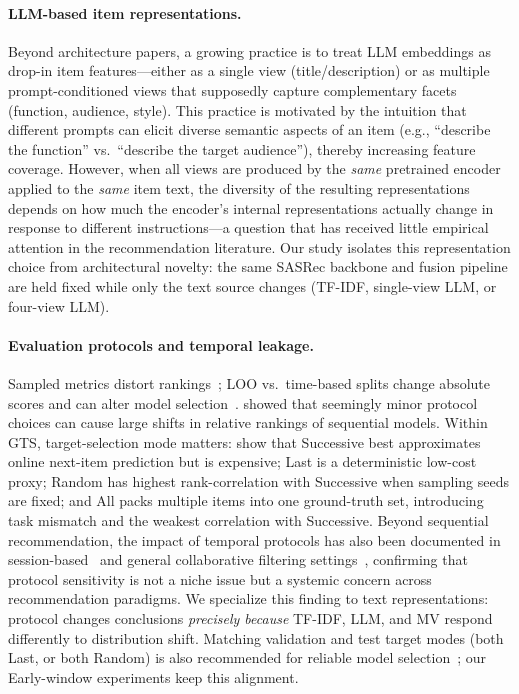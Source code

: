 \documentclass[sigconf,natbib=true,anonymous]{acmart}
\newcommand{\tfidf}{\textsc{TF-IDF}\xspace}
\newcommand{\llm}{\textsc{LLM}\xspace}
\newcommand{\mv}{\textsc{MV}\xspace}
\begin{document}
\paragraph{LLM-based item representations.}
Beyond architecture papers, a growing practice is to treat LLM embeddings as drop-in item features---either as a single view (title/description) or as multiple prompt-conditioned views that supposedly capture complementary facets (function, audience, style).
This practice is motivated by the intuition that different prompts can elicit diverse semantic aspects of an item (e.g., ``describe the function'' vs.\ ``describe the target audience''), thereby increasing feature coverage.
However, when all views are produced by the \emph{same} pretrained encoder applied to the \emph{same} item text, the diversity of the resulting representations depends on how much the encoder's internal representations actually change in response to different instructions---a question that has received little empirical attention in the recommendation literature.
Our study isolates this representation choice from architectural novelty: the same SASRec backbone and fusion pipeline are held fixed while only the text source changes (\tfidf, single-view \llm, or four-view \llm).

\paragraph{Evaluation protocols and temporal leakage.}
Sampled metrics distort rankings~\cite{krichene2020sampledmetrics}; LOO vs.\ time-based splits change absolute scores and can alter model selection~\cite{ji2023evaluation,sun2023reevaluation,meng2020temporal}.
\citet{hidasi2018recurrent} showed that seemingly minor protocol choices can cause large shifts in relative rankings of sequential models.
Within GTS, target-selection mode matters: \citet{liang2024timetosplit} show that Successive best approximates online next-item prediction but is expensive; Last is a deterministic low-cost proxy; Random has highest rank-correlation with Successive when sampling seeds are fixed; and All packs multiple items into one ground-truth set, introducing task mismatch and the weakest correlation with Successive.
Beyond sequential recommendation, the impact of temporal protocols has also been documented in session-based~\cite{hidasi2018recurrent} and general collaborative filtering settings~\cite{meng2020temporal}, confirming that protocol sensitivity is not a niche issue but a systemic concern across recommendation paradigms.
We specialize this finding to text representations: protocol changes conclusions \emph{precisely because} \tfidf, \llm, and \mv respond differently to distribution shift.
Matching validation and test target modes (both Last, or both Random) is also recommended for reliable model selection~\cite{liang2024timetosplit}; our Early-window experiments keep this alignment.
\end{document}
